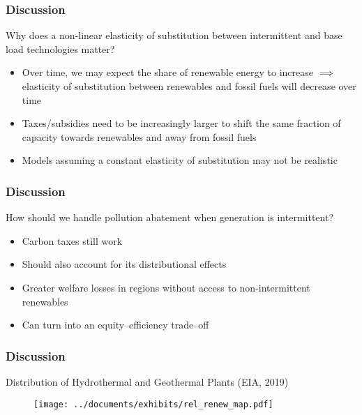 \documentclass[aspectratio=169]{beamer}
\begin{document}
\begin{frame}
\frametitle{Discussion}

\begin{block}{Why does a non-linear elasticity of substitution between intermittent and base load technologies matter?}
	\begin{itemize}
		\setlength\itemsep{0.5em}
		\item Over time, we may expect the share of renewable energy to increase $\implies$ elasticity of substitution between renewables and fossil fuels will decrease over time
		\item Taxes/subsidies need to be increasingly larger to shift the same fraction of capacity towards renewables and away from fossil fuels 
		\item Models assuming a constant elasticity of substitution may not be realistic
	\end{itemize}
\end{block}
\end{frame}


\begin{frame}
\frametitle{Discussion}

\begin{block}{How should we handle pollution abatement when generation is intermittent?}
	\begin{itemize}
		\setlength\itemsep{0.5em}
		\item<1-> Carbon taxes still work
		\item<2-> Should also account for its distributional effects
		\item<3-> Greater welfare losses in regions without access to non-intermittent renewables
		\item<4-> Can turn into an equity--efficiency trade--off
	\end{itemize}
\end{block}
\end{frame}


\begin{frame}
\frametitle{Discussion}

\begin{block}{\centering Distribution of Hydrothermal and Geothermal Plants (EIA, 2019)}
\end{block}

\begin{figure}
	\vspace{-1em}
	\texttt{[image: ../documents/exhibits/rel\_renew\_map.pdf]} 
\end{figure}

\end{frame}
\end{document}
